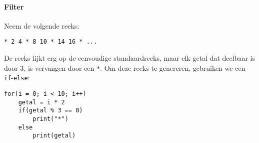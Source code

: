 \paragraph{Filter}

Neem de volgende reeks:

\begin{verbatim}
* 2 4 * 8 10 * 14 16 * ...
\end{verbatim}

De reeks lijkt erg op de eenvoudige standaardreeks, maar elk getal dat deelbaar is door 3, is vervangen door een \texttt{*}. Om deze reeks te genereren, gebruiken we een \texttt{if}-\texttt{else}:

\begin{verbatim}
for(i = 0; i < 10; i++)
    getal = i * 2
    if(getal % 3 == 0)
        print("*")
    else
        print(getal)
\end{verbatim}


%
%






